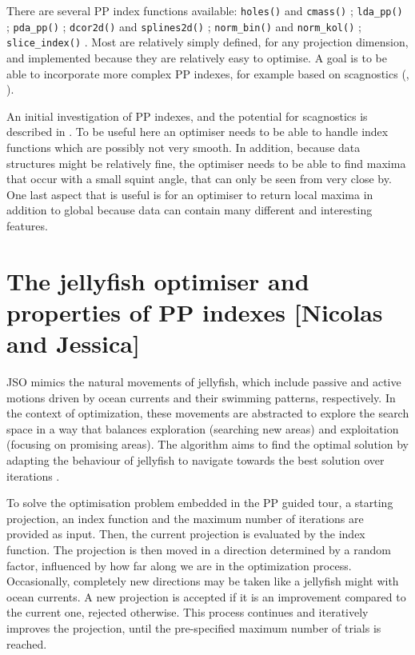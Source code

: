 \documentclass[
  number,
  preprint,
  3p]{elsarticle}
\begin{document}
There are several PP index functions available: \texttt{holes()} and
\texttt{cmass()} \citep{cook1993projection}; \texttt{lda\_pp()}
\citep{lee2005projection}; \texttt{pda\_pp()} \citep{lee2010projection};
\texttt{dcor2d()} and \texttt{splines2d()} \citep{Grimm2016};
\texttt{norm\_bin()} and \texttt{norm\_kol()} \citep{huber85};
\texttt{slice\_index()} \citep{Laa:2020wkm}. Most are relatively simply
defined, for any projection dimension, and implemented because they are
relatively easy to optimise. A goal is to be able to incorporate more
complex PP indexes, for example based on scagnostics (\citet{scag},
\citet{WW08}).

An initial investigation of PP indexes, and the potential for
scagnostics is described in \citet{laa_using_2020}. To be useful here an
optimiser needs to be able to handle index functions which are possibly
not very smooth. In addition, because data structures might be
relatively fine, the optimiser needs to be able to find maxima that
occur with a small squint angle, that can only be seen from very close
by. One last aspect that is useful is for an optimiser to return local
maxima in addition to global because data can contain many different and
interesting features.

\hypertarget{sec-theory}{%
\section{The jellyfish optimiser and properties of PP indexes {[}Nicolas
and Jessica{]}}\label{sec-theory}}

JSO mimics the natural movements of jellyfish, which include passive and
active motions driven by ocean currents and their swimming patterns,
respectively. In the context of optimization, these movements are
abstracted to explore the search space in a way that balances
exploration (searching new areas) and exploitation (focusing on
promising areas). The algorithm aims to find the optimal solution by
adapting the behaviour of jellyfish to navigate towards the best
solution over iterations \citep{chou_novel_2021}.

To solve the optimisation problem embedded in the PP guided tour, a
starting projection, an index function and the maximum number of
iterations are provided as input. Then, the current projection is
evaluated by the index function. The projection is then moved in a
direction determined by a random factor, influenced by how far along we
are in the optimization process. Occasionally, completely new directions
may be taken like a jellyfish might with ocean currents. A new
projection is accepted if it is an improvement compared to the current
one, rejected otherwise. This process continues and iteratively improves
the projection, until the pre-specified maximum number of trials is
reached.
\end{document}
